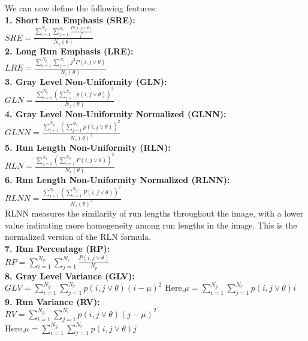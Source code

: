 We can now define the following features: \\
\textbf{1. Short Run Emphasis (SRE):}\\
$SRE=\frac{\sum _{i=1}^{N_{g}}\sum _{j=1}^{N_{r}}\frac{P\left(i,j\vee \theta \right)}{j^{2}}}{N_{z}\left(\theta \right)}$\\
\textbf{2. Long Run Emphasis (LRE):}\\
$LRE=\frac{\sum _{i=1}^{N_{g}}\sum _{j=1}^{N_{r}}j^{2}P\left(i,j\vee \theta \right)}{N_{z}\left(\theta \right)}$\\
\textbf{3. Gray Level Non-Uniformity (GLN):}\\
$GLN=\frac{\sum _{i=1}^{N_{g}}\left(\sum _{j=1}^{N_{r}}p\left(i,j\vee \theta \right)\right)^{2}}{N_{z}\left(\theta \right)}$\\
\textbf{4. Gray Level Non-Uniformity Normalized (GLNN):}\\
$GLNN=\frac{\sum _{i=1}^{N_{g}}\left(\sum _{j=1}^{N_{r}}p\left(i,j\vee \theta \right)\right)^{2}}{{N_{z}}\left(\theta \right)^{2}}$\\
\textbf{5. Run Length Non-Uniformity (RLN):}\\
$RLN=\frac{\sum _{j=1}^{N_{r}}\left(\sum _{i=1}^{N_{g}}P\left(i,j\vee \theta \right)\right)^{2}}{N_{z}\left(\theta \right)}$\\
\textbf{6. Run Length Non-Uniformity Normalized (RLNN):}\\
$RLNN=\frac{\sum _{j=1}^{N_{r}}\left(\sum _{i=1}^{N_{g}}P\left(i,j\vee \theta \right)\right)^{2}}{{N_{z}}\left(\theta \right)^{2}}$\\
RLNN measures the similarity of run lengths throughout the image, with a lower value indicating more homogeneity among run lengths in the image. This is the normalized version of the RLN formula.\\
\textbf{7. Run Percentage (RP):}\\
$RP=\sum _{i=1}^{N_{g}}\sum _{j=1}^{N_{r}}\frac{P\left(i,j\vee \theta \right)}{N_{p}}$\\
\textbf{8. Gray Level Variance (GLV):}\\
$GLV=\sum _{i=1}^{N_{g}}\sum _{j=1}^{N_{r}}p\left(i,j\vee \theta \right)\left(i-\mu \right)^{2}$
Here,$\mu =\sum _{i=1}^{N_{g}}\sum _{j=1}^{N_{r}}p\left(i,j\vee \theta \right)i$\\
\textbf{9. Run Variance (RV):}\\
$RV=\sum _{i=1}^{N_{g}}\sum _{j=1}^{N_{r}}p\left(i,j\vee \theta \right)\left(j-\mu \right)^{2}$\\
Here,$\mu =\sum _{i=1}^{N_{g}}\sum _{j=1}^{N_{r}}p\left(i,j\vee \theta \right)j$\\
